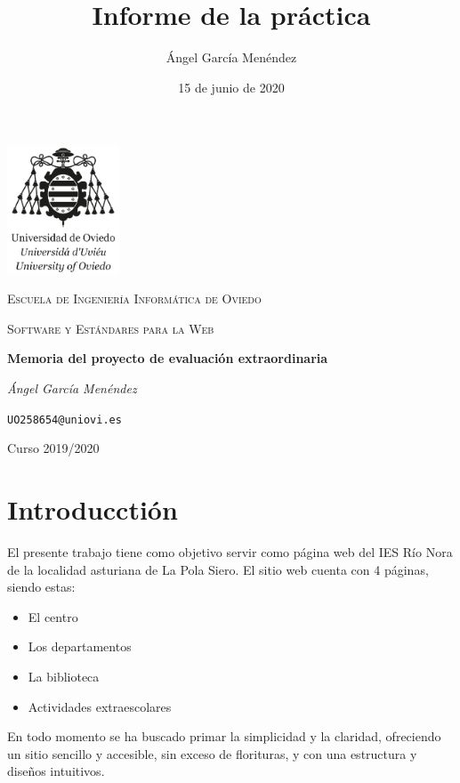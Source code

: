 \documentclass[11pt]{article}
\title{Informe de la práctica}
\author{Ángel García Menéndez}
\date{15 de junio de 2020}
\begin{document}
        \begin{titlepage}
            \centering
            \includegraphics[width=0.25\textwidth]{logo}\par\vspace{1cm}
            {\scshape\LARGE Escuela de Ingeniería Informática de Oviedo\par}
            \vspace{1cm}
            {\scshape\Large Software y Estándares para la Web\par}
            \vspace{1.5cm}
            {\Huge\bfseries Memoria del proyecto de evaluación extraordinaria\par}
            \vspace{2cm}
            {\Large\itshape Ángel García Menéndez\par}
            {\Large\texttt{UO258654@uniovi.es}\par}
            \vfill

            {\large Curso 2019/2020\par}
        \end{titlepage}

        \tableofcontents
        \newpage
        \section{Introducctión}\label{intro}
        El presente trabajo tiene como objetivo servir como página web del IES Río Nora de la localidad asturiana de La Pola Siero.
        El sitio web cuenta con 4 páginas, siendo estas:
        \begin{itemize}
            \item El centro
            \item Los departamentos
            \item La biblioteca
            \item Actividades extraescolares
        \end{itemize}

        En todo momento se ha buscado primar la simplicidad y la claridad, ofreciendo un sitio sencillo y accesible, sin exceso de florituras, y con una estructura y diseños intuitivos.
\end{document}
